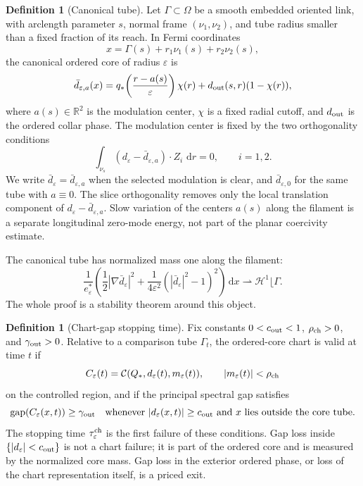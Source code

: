 \documentclass[11pt]{article}
\theoremstyle{definition}
\newtheorem{definition}[theorem]{Definition}
\newcommand{\R}{\mathbb R}
\newcommand{\dd}{\,\mathrm d}
\newcommand{\eps}{\varepsilon}
\newcommand{\estar}{e_\varepsilon^\ast}
\newcommand{\Hh}{\mathcal H}
\newcommand{\gap}{\operatorname{gap}}
\begin{document}
\begin{definition}[Canonical tube]
\label{def:short-canonical-tube}
Let \(\Gamma\subset\Omega\) be a smooth embedded oriented link, with arclength
parameter \(s\), normal frame \((\nu_1,\nu_2)\), and tube radius smaller than a
fixed fraction of its reach.  In Fermi coordinates
\[
        x=\Gamma(s)+r_1\nu_1(s)+r_2\nu_2(s),
\]
the canonical ordered core of radius \(\eps\) is
\[
        \bar d_{\eps,a}(x)
        =
        q_\ast\!\left(\frac{r-a(s)}{\eps}\right)
        \chi(r)
        +
        d_{\rm out}(s,r)(1-\chi(r)),
\]
where \(a(s)\in\R^2\) is the modulation center, \(\chi\) is a fixed radial
cutoff, and \(d_{\rm out}\) is the ordered collar phase.  The modulation center
is fixed by the two orthogonality conditions
\[
        \int_{\nu_s}
        (d_\eps-\bar d_{\eps,a})\cdot Z_i
        \,\dd r=0,
        \qquad i=1,2 .
\]
We write \(\bar d_\eps=\bar d_{\eps,a}\) when the selected modulation is clear,
and \(\bar d_{\eps,0}\) for the same tube with \(a\equiv0\).  The slice
orthogonality removes only the local translation component of
\(d_\eps-\bar d_{\eps,a}\).  Slow variation of the centers \(a(s)\) along the
filament is a separate longitudinal zero-mode energy, not part of the planar
coercivity estimate.
\end{definition}

The canonical tube has normalized mass one along the filament:
\[
        \frac{1}{\estar}
        \left(
        \frac12|\nabla\bar d_\eps|^2
        +
        \frac{1}{4\eps^2}(|\bar d_\eps|^2-1)^2
        \right)\dd x
        \rightharpoonup
        \Hh^1\lfloor\Gamma .
\]
The whole proof is a stability theorem around this object.

\begin{definition}[Chart-gap stopping time]
\label{def:chart-gap-stopping}
Fix constants \(0<c_{\rm out}<1\), \(\rho_{\rm ch}>0\), and
\(\gamma_{\rm out}>0\).  Relative to a comparison tube \(\Gamma_t\), the
ordered-core chart is valid at time \(t\) if
\[
        C_\eps(t)=\mathcal C(Q_\ast,d_\eps(t),m_\eps(t)),
        \qquad
        |m_\eps(t)|<\rho_{\rm ch}
\]
on the controlled region, and if the principal spectral gap satisfies
\[
        \gap(C_\eps(x,t))\ge\gamma_{\rm out}
        \quad
        \hbox{whenever } |d_\eps(x,t)|\ge c_{\rm out}
        \hbox{ and } x \hbox{ lies outside the core tube}.
\]
The stopping time \(\tau_\eps^{\rm ch}\) is the first failure of these
conditions.  Gap loss inside \(\{|d_\eps|<c_{\rm out}\}\) is not a chart
failure; it is part of the ordered core and is measured by the normalized core
mass.  Gap loss in the exterior ordered phase, or loss of the chart
representation itself, is a priced exit.
\end{definition}
\end{document}
